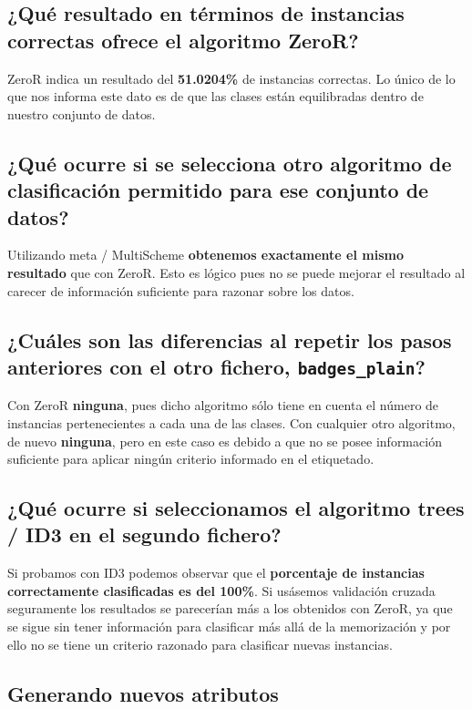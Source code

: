 \documentclass[12pt]{article}
\begin{document}
\subsection*{\small ¿Qué resultado en términos de instancias correctas ofrece el
algoritmo ZeroR?}

ZeroR indica un resultado del \textbf{51.0204\%} de instancias correctas. Lo único de lo que nos informa este dato es de que las clases están equilibradas dentro de nuestro conjunto de datos.

\subsection*{\small ¿Qué ocurre si se selecciona otro algoritmo de clasificación permitido para ese conjunto de datos?}

Utilizando meta / MultiScheme \textbf{obtenemos exactamente el mismo resultado} que con ZeroR. Esto es lógico pues no se puede mejorar el resultado al carecer de información suficiente para razonar sobre los datos.

\subsection*{\small ¿Cuáles son las diferencias al repetir los pasos anteriores con el otro fichero, \texttt{badges\_plain}?}

Con ZeroR \textbf{ninguna}, pues dicho algoritmo sólo tiene en cuenta el número de instancias pertenecientes a cada una de las clases. Con cualquier otro algoritmo, de nuevo \textbf{ninguna}, pero en este caso es debido a que no se posee información suficiente para aplicar ningún criterio informado en el etiquetado.

\subsection*{\small ¿Qué ocurre si seleccionamos el algoritmo trees / ID3 en el segundo fichero?}

Si probamos con ID3 podemos observar que el \textbf{porcentaje de instancias correctamente clasificadas es del 100\%}. Si usásemos validación cruzada seguramente los resultados se parecerían más a los obtenidos con ZeroR, ya que se sigue sin tener información para clasificar más allá de la memorización y por ello no se tiene un criterio razonado para clasificar nuevas instancias.

\newpage

\begin{center}
\section{Generando nuevos atributos}
\end{center}
\end{document}
